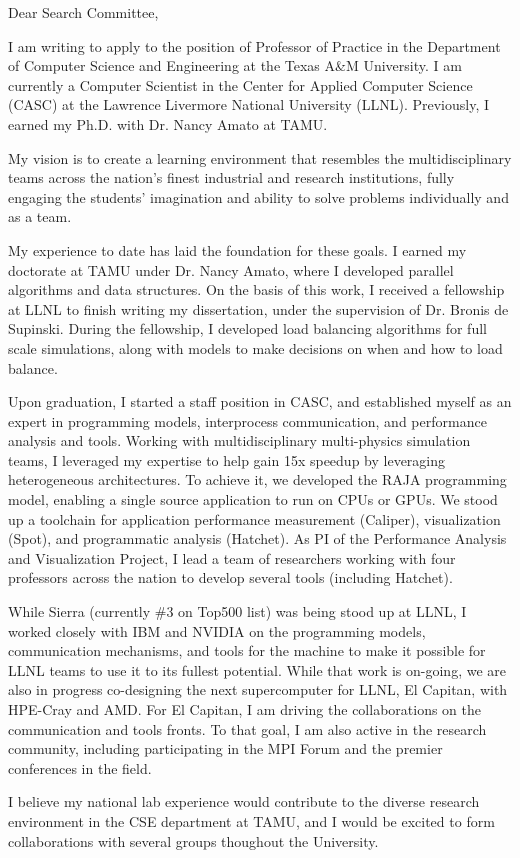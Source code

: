 \documentclass[11pt]{article}
\begin{document}
Dear Search Committee,

I am writing to apply to the position of Professor of Practice in the Department of Computer Science and Engineering at the Texas A\&M University.  I am currently a Computer Scientist in the Center for Applied Computer Science (CASC) at the Lawrence Livermore National University (LLNL).  Previously, I earned my Ph.D. with Dr. Nancy Amato at TAMU.

My vision is to create a learning environment that resembles the multidisciplinary teams across the nation's finest industrial and research institutions,
fully engaging the students' imagination and ability to solve problems individually and as a team.

My experience to date has laid the foundation for these goals.  I earned my doctorate at TAMU under Dr. Nancy Amato, where I developed parallel algorithms and data structures.
On the basis of this work, I received a fellowship at LLNL to finish writing my dissertation, under the supervision of Dr. Bronis de Supinski.
During the fellowship, I developed load balancing algorithms for full scale simulations, along with models to make decisions on when and how to load balance.

Upon graduation, I started a staff position in CASC, and established myself as an expert in programming models, interprocess communication, and performance analysis and tools.
Working with multidisciplinary multi-physics simulation teams, I leveraged my expertise to help gain 15x speedup by leveraging heterogeneous architectures.
To achieve it, we developed the RAJA programming model, enabling a single source application to run on CPUs or GPUs.
We stood up a toolchain for application performance measurement (Caliper), visualization (Spot), and programmatic analysis (Hatchet).
As PI of the Performance Analysis and Visualization Project, I lead a team of researchers working with four professors across the nation
to develop several tools (including Hatchet).

While Sierra (currently \#3 on Top500 list) was being stood up at LLNL, I worked closely with IBM and NVIDIA on the programming models,
communication mechanisms, and tools for the machine to make it possible for LLNL teams to use it to its fullest potential.
While that work is on-going, we are also in progress co-designing the next supercomputer for LLNL, El Capitan, with HPE-Cray and AMD.
For El Capitan, I am driving the collaborations on the communication and tools fronts.  To that goal,
I am also active in the research community, including participating in the MPI Forum and the premier conferences in the field.

I believe my national lab experience would contribute to the diverse research environment in the CSE department at TAMU, and I would be excited to form collaborations with several groups thoughout the University.



\end{document}
